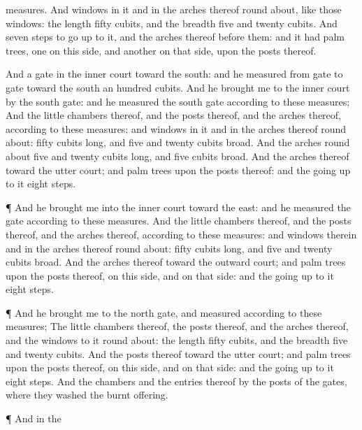 {measures.
And
{}
windows in it and in the
arches thereof round
about, like those
windows: the
length
{}
fifty
cubits, and the
breadth
five and
twenty
cubits.
And
{}
seven
steps to go
up to it, and the
arches thereof
{}
before them: and it had palm
trees,
one on this side, and
another on that side, upon the
posts thereof.
\par }{\PP {}And
{} a
gate in the
inner
court
toward the
south: and he
measured from
gate to
gate
toward the
south an
hundred
cubits.
And he
brought me to the
inner
court by the
south
gate: and he
measured the
south
gate according to these
measures;
And the little
chambers thereof, and the
posts thereof, and the
arches thereof, according to these
measures: and
{}
windows in it and in the
arches thereof round
about:
{}
fifty
cubits
long, and
five and
twenty
cubits
broad.
And the
arches round
about
{}
five and
twenty
cubits
long, and
five
cubits
broad.
And the
arches thereof
{} toward the
utter
court; and palm
trees
{} upon the
posts thereof: and the going
up to it
{}
eight
steps.
\par }{\PP {}¶ And he
brought me into the
inner
court
toward the
east: and he
measured the
gate according to these
measures.
And the little
chambers thereof, and the
posts thereof, and the
arches thereof,
{} according to these
measures: and
{}
windows therein and in the
arches thereof round
about:
{}
fifty
cubits
long, and
five and
twenty
cubits
broad.
And the
arches thereof
{} toward the
outward
court; and palm
trees
{} upon the
posts thereof, on this side, and on that side: and the going
up to it
{}
eight
steps.
\par }{\PP {}¶ And he
brought me to the
north
gate, and
measured
{} according to these
measures;
The little
chambers thereof, the
posts thereof, and the
arches thereof, and the
windows to it round
about: the
length
{}
fifty
cubits, and the
breadth
five and
twenty
cubits.
And the
posts thereof
{} toward the
utter
court; and palm
trees
{} upon the
posts thereof, on this side, and on that side: and the going
up to it
{}
eight
steps.
And the
chambers and the
entries thereof
{} by the
posts of the
gates, where they
washed the burnt
offering.
\par }{\PP {}¶ And in the
}
